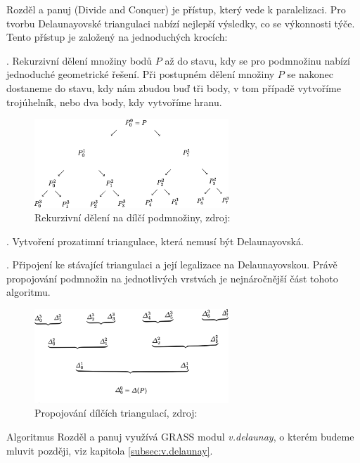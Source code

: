 \documentclass[12pt,a4paper]{article}
\begin{document}
Rozděl a panuj (Divide and Conquer) je přístup, který vede k paralelizaci. Pro tvorbu
Delaunayovské triangulaci nabízí nejlepší výsledky, co se výkonnosti
týče. Tento přístup je založený na jednoduchých krocích:

. Rekurzivní dělení množiny bodů $P$ až do stavu, kdy se
pro podmnožinu nabízí jednoduché geometrické řešení. Při postupném
dělení množiny $P$ se nakonec dostaneme do stavu, kdy nám zbudou buď
tři body, v tom případě vytvoříme trojúhelník, nebo dva body, kdy
vytvoříme hranu.
\begin{figure}[h!]
\centering
\includegraphics[width=0.65\textwidth]{img/div_n_conq.png}
\caption{Rekurzivní dělení na dílčí podmnožiny, zdroj: \cite{triangulation}}
\label{fig:div_n_conq}
\end{figure}

. Vytvoření prozatimní triangulace, která nemusí být
Delaunayovská.

. Připojení ke stávající triangulaci a její legalizace na
Delaunayovskou. Právě propojování podmnožin na jednotlivých vrstvách
je nejnáročnější část tohoto algoritmu.

\bigskip

\begin{figure}[h!]
\centering
\includegraphics[width=0.65\textwidth]{img/merge.png}
\caption{Propojování dílčích triangulací, zdroj: \cite{triangulation}}
\label{fig:merge}
\end{figure}

Algoritmus Rozděl a panuj využívá GRASS modul \emph{v.delaunay}, o
kterém budeme mluvit později, viz kapitola \ref{subsec:v.delaunay}.
\end{document}

